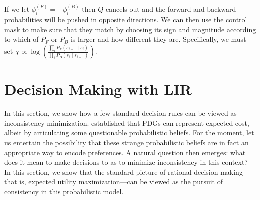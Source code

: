 \documentclass{article} %
\theoremstyle{plain}
\theoremstyle{definition}
\theoremstyle{remark}
\begin{document}
If we let $\phi^{(F)}_i = -\phi^{(B)}_i$ then $Q$ cancels out and the forward and backward probabilities will be pushed in opposite directions. We can then use the control mask to make sure that they match by choosing its sign and magnitude according to which of $P_F$ or $P_B$ is larger and how different they are. Specifically, we must set $\chi \propto \log\left( \frac{\prod_i P_F(s_{i+1} \mid s_i)}{\prod_i P_B(s_i \mid s_{i+1})} \right)$.





\section{Decision Making with LIR}

In this section, we show how a few standard decision rules can be viewed as inconsistency minimization. 
% 
 established that PDGs can represent expected cost,
albeit by articulating some questionable probabilistic beliefs. 
For the moment, let us entertain the possibility that these strange probabilistic beliefs are in fact an appropriate way to encode preferences.
A natural question then emerges: what does it mean to make decisions to as to minimize inconsistency in this context? 
In this section, we show that the standard picture of rational decision making---that is, expected utility maximization---can be viewed as the pursuit of consistency in this probabilistic model. 
\end{document}
